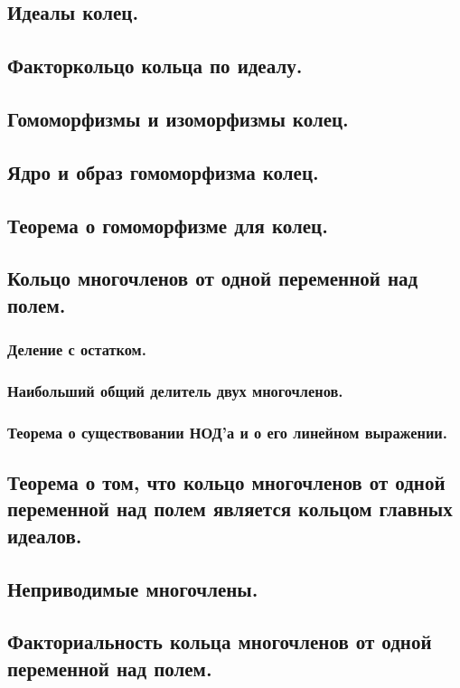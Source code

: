 \mysection
\subsection{Идеалы колец.}
\subsection{Факторкольцо кольца по идеалу.}
\subsection{Гомоморфизмы и изоморфизмы колец.}
\subsection{Ядро и образ гомоморфизма колец.}
\subsection{Теорема о гомоморфизме для колец.}

\newpage
\mysection
\subsection{Кольцо многочленов от одной переменной над полем.}
\subsubsection{Деление с остатком.}
\subsubsection{Наибольший общий делитель двух многочленов.}
\subsubsection{Теорема о существовании НОД'а и о его линейном выражении.}

\newpage
\mysection
\subsection{Теорема о том, что кольцо многочленов от одной
            переменной над полем является кольцом главных идеалов.}

\newpage
\mysection
\subsection{Неприводимые многочлены.}
\subsection{Факториальность кольца многочленов от одной переменной над полем.}

